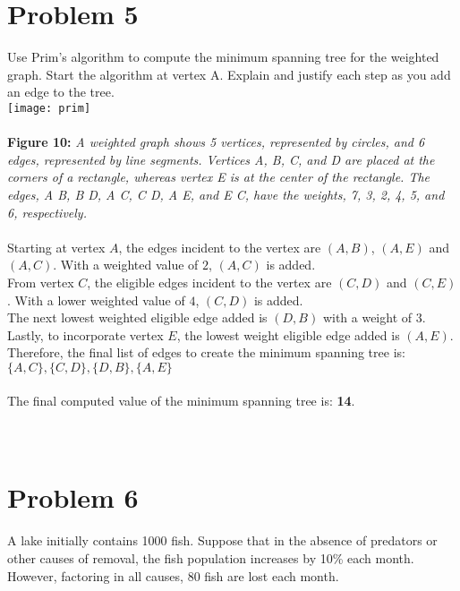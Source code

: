 \documentclass{amsart}
\theoremstyle{definition}
\theoremstyle{Exercise}
\theoremstyle{remark}
\theoremstyle{rule}
\numberwithin{equation}{section}
\begin{document}
  \section*{Problem 5}
  Use Prim's algorithm to compute the minimum spanning tree for the weighted graph. Start the algorithm at vertex A. Explain and justify each step as you add an edge to the tree.
\\
\texttt{[image: prim]}
\\\\
{\color{blue} {\bf Figure 10:} \emph{A weighted graph shows 5 vertices, represented by circles, and 6 edges, represented by line segments. Vertices A, B, C, and D are placed at the corners of a rectangle, whereas vertex E is at the center of the rectangle. The edges, A B, B D, A C, C D, A E, and E C, have the weights, 7, 3, 2, 4, 5, and 6, respectively.
  }
}
\\\\
Starting at vertex $A$, the edges incident to the vertex are $(A, B)$, $(A, E)$ and $(A, C)$. With a weighted value of $2$, $(A, C)$ is added.\\
From vertex $C$, the eligible edges incident to the vertex are $(C, D)$ and $(C, E)$. With a lower weighted value of $4$, $(C, D)$ is added.\\
The next lowest weighted eligible edge added is $(D, B)$ with a weight of $3$.\\
Lastly, to incorporate vertex $E$, the lowest weight eligible edge added is $(A, E)$.\\
Therefore, the final list of edges to create the minimum spanning tree is: $\{A, C\}, \{C, D\}, \{D, B\}, \{A, E\}$\\\\
The final computed value of the minimum spanning tree is: {\Large \bf 14}.
\\\\
 \newpage
~\\
  \section*{Problem 6}
A lake initially contains 1000 fish. Suppose that in the absence of predators or other causes of removal, the fish population increases by 10\% each month. However, factoring in all causes, 80 fish are lost each month.\\
\end{document}
